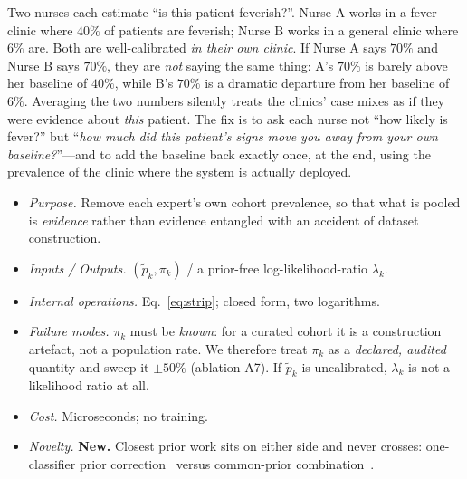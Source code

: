 \documentclass[sigplan,nonacm,screen]{acmart}
\begin{document}
\begin{exbox}
Two nurses each estimate ``is this patient feverish?''. Nurse A works in a fever clinic where $40\%$ of patients are feverish; Nurse B works in a general clinic where $6\%$ are. Both are well-calibrated \emph{in their own clinic}. If Nurse A says $70\%$ and Nurse B says $70\%$, they are \emph{not} saying the same thing: A's $70\%$ is barely above her baseline of $40\%$, while B's $70\%$ is a dramatic departure from her baseline of $6\%$. Averaging the two numbers silently treats the clinics' case mixes as if they were evidence about \emph{this} patient. The fix is to ask each nurse not ``how likely is fever?'' but ``\emph{how much did this patient's signs move you away from your own baseline?}''---and to add the baseline back exactly once, at the end, using the prevalence of the clinic where the system is actually deployed.
\end{exbox}

\begin{itemize}
  \item \emph{Purpose.} Remove each expert's own cohort prevalence, so that what is pooled is \emph{evidence} rather than evidence entangled with an accident of dataset construction.
  \item \emph{Inputs / Outputs.} $(\tilde p_k,\pi_k)$ / a prior-free log-likelihood-ratio $\lambda_k$.
  \item \emph{Internal operations.} Eq.~\eqref{eq:strip}; closed form, two logarithms.
  \item \emph{Failure modes.} $\pi_k$ must be \emph{known}: for a curated cohort it is a construction artefact, not a population rate. We therefore treat $\pi_k$ as a \emph{declared, audited} quantity and sweep it $\pm50\%$ (ablation A7). If $\tilde p_k$ is uncalibrated, $\lambda_k$ is not a likelihood ratio at all.
  \item \emph{Cost.} Microseconds; no training.
  \item \emph{Novelty.} \textbf{New.} Closest prior work sits on either side and never crosses: one-classifier prior correction~\cite{saerens2002adjusting,alexandari2020maximum,godau2023deployment} versus common-prior combination~\cite{kittler1998combining,genest1986combining,chen2022proben}.
\end{itemize}
\end{document}
